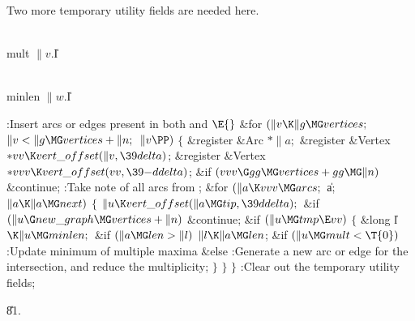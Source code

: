 Two more temporary utility fields are needed here.

\Y\B\4\D\\{mult}\5
$\|v.{}$\|I\par
\B\4\D\\{minlen}\5
$\|w.{}$\|I\par
\Y\B\4:Insert arcs or edges present in both  and \X${}%
\E{}$\6
\&{for} ${}(\|v\K\|g\MG\\{vertices};{}$ ${}\|v<\|g\MG\\{vertices}+\|n;{}$ ${}%
\|v\PP){}$\5
${}\{{}$\5
\1\&{register} \&{Arc} ${}{*}\|a;{}$\6
\&{register} \&{Vertex} ${}{*}\\{vv}\K\\{vert\_offset}(\|v,\39\\{delta}){}$;\6
\&{register} \&{Vertex} ${}{*}\\{vvv}\K\\{vert\_offset}(\\{vv},\39{-}%
\\{ddelta}){}$;\7
\&{if} ${}(\\{vvv}\G\\{gg}\MG\\{vertices}+\\{gg}\MG\|n){}$\1\5
\&{continue};\2\6
:Take note of all arcs from \X;\6
\&{for} ${}(\|a\K\\{vvv}\MG\\{arcs};{}$ \|a; ${}\|a\K\|a\MG\\{next}){}$\5
${}\{{}$\1\6
${}\|u\K\\{vert\_offset}(\|a\MG\\{tip},\39\\{ddelta});{}$\6
\&{if} ${}(\|u\G\\{new\_graph}\MG\\{vertices}+\|n){}$\1\5
\&{continue};\2\6
\&{if} ${}(\|u\MG\\{tmp}\E\\{vv}){}$\5
${}\{{}$\5
\1\&{long} \|l${}\K\|u\MG\\{minlen};{}$\7
\&{if} ${}(\|a\MG\\{len}>\|l){}$\1\5
${}\|l\K\|a\MG\\{len}{}$;\2\6
\&{if} ${}(\|u\MG\\{mult}<\T{0}){}$\1\5
:Update minimum of multiple maxima\X\2\6
\&{else}\1\5
:Generate a new arc or edge for the intersection, and reduce the
multiplicity\X;\2\6
\4${}\}{}$\2\6
\4${}\}{}$\2\6
\4${}\}{}$\2\6
:Clear out the temporary utility fields\X;\par
\U81.\fi

